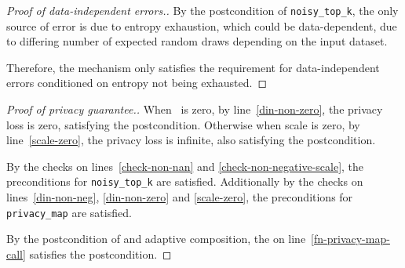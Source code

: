 \documentclass{article}
\begin{document}
\begin{theorem}
    \label{postcondition}
\end{theorem}

\begin{proof}[Proof of data-independent errors.]
    By the postcondition of \texttt{noisy\_top\_k},
    the only source of error is due to entropy exhaustion, which could be data-dependent,
    due to differing number of expected random draws depending on the input dataset.

    Therefore, the mechanism only satisfies the requirement for data-independent errors conditioned on entropy not being exhausted.
\end{proof}

\begin{proof}[Proof of privacy guarantee.]
    When \din\ is zero, by line~\ref{din-non-zero}, the privacy loss is zero, satisfying the postcondition.
    Otherwise when scale is zero, by line~\ref{scale-zero}, the privacy loss is infinite, also satisfying the postcondition.

    By the checks on lines~\ref{check-non-nan} and \ref{check-non-negative-scale},
    the preconditions for \texttt{noisy\_top\_k} are satisfied.
    Additionally by the checks on lines~\ref{din-non-neg}, \ref{din-non-zero} and \ref{scale-zero},
    the preconditions for \texttt{privacy\_map} are satisfied.

    By the postcondition of  and adaptive composition,
    the \dout on line~\ref{fn-privacy-map-call} satisfies the postcondition.
\end{proof}
\end{document}
